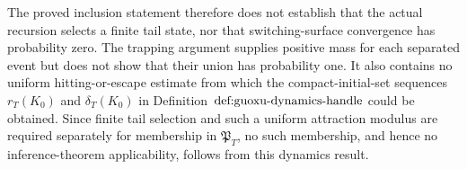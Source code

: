 The proved inclusion statement therefore does not establish that the actual recursion selects a finite tail state, nor that switching-surface convergence has probability zero.  The trapping argument supplies positive mass for each separated event but does not show that their union has probability one.  It also contains no uniform hitting-or-escape estimate from which the compact-initial-set sequences \(r_T(K_0)\) and \(\delta_T(K_0)\) in Definition~\(\textnormal{def:guoxu-dynamics-handle}\) could be obtained.  Since finite tail selection and such a uniform attraction modulus are required separately for membership in \(\mathfrak P_T\), no such membership, and hence no inference-theorem applicability, follows from this dynamics result.
